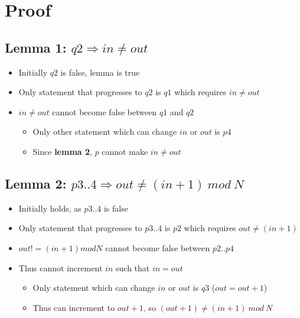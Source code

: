\documentclass[12pt,a4paper]{article}
\begin{document}
\section{Proof}

\subsection*{\textbf{Lemma 1}: $q2 \Longrightarrow in \neq out$}
\begin{itemize}
    \item Initially $q2$ is false, lemma is true
    \item Only statement that progresses to $q2$ is $q1$ which requires $in \neq out$
    \item $in \neq out$ cannot become false between $q1$ and $q2$
    \begin{itemize}
        \item Only other statement which can change $in$ or $out$ is $p4$
        \item Since \textbf{lemma 2}, $p$ cannot make $in \neq out$
    \end{itemize}
\end{itemize}

\subsection*{\textbf{Lemma 2}: $p3..4 \Longrightarrow out \neq (in+1)\ mod\ N$}
\begin{itemize}
    \item Initially holds, as $p3..4$ is false
    \item Only statement that progresses to $p3..4$ is $p2$ which requires $out \neq (in+1)$
    \item $out != (in + 1) mod N$ cannot become false between $p2..p4$
    \item Thus cannot increment $in$ such that $in = out$
    \begin{itemize}
        \item Only statement which can change $in$ or $out$ is $q3$ ($out = out + 1$)
        \item Thus can increment to $out+1$, so $(out+1) \neq (in+1)\ mod\ N$
    \end{itemize}
\end{itemize}
\end{document}
